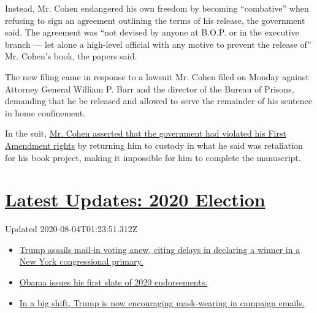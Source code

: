 Instead, Mr. Cohen endangered his own freedom by becoming ``combative''
when refusing to sign an agreement outlining the terms of his release,
the government said. The agreement was ``not devised by anyone at B.O.P.
or in the executive branch --- let alone a high-level official with any
motive to prevent the release of'' Mr. Cohen's book, the papers said.

The new filing came in response to a lawsuit Mr. Cohen filed on Monday
against Attorney General William P. Barr and the director of the Bureau
of Prisons, demanding that he be released and allowed to serve the
remainder of his sentence in home confinement.

In the suit,
\href{https://www.nytimes3xbfgragh.onion/2020/07/21/nyregion/michael-cohen-trump-book.html}{Mr.
Cohen asserted that the government had violated his First Amendment
rights} by returning him to custody in what he said was retaliation for
his book project, making it impossible for him to complete the
manuscript.

\hypertarget{latest-updates-2020-election}{%
\section{\texorpdfstring{\href{https://www.nytimes3xbfgragh.onion/2020/08/03/us/elections/biden-vs-trump.html?action=click\&pgtype=Article\&state=default\&region=MAIN_CONTENT_1\&context=storylines_live_updates}{Latest
Updates: 2020
Election}}{Latest Updates: 2020 Election}}\label{latest-updates-2020-election}}

Updated 2020-08-04T01:23:51.312Z

\begin{itemize}
\tightlist
\item
  \href{https://www.nytimes3xbfgragh.onion/2020/08/03/us/elections/biden-vs-trump.html?action=click\&pgtype=Article\&state=default\&region=MAIN_CONTENT_1\&context=storylines_live_updates\#link-6494b448}{Trump
  assails mail-in voting anew, citing delays in declaring a winner in a
  New York congressional primary.}
\item
  \href{https://www.nytimes3xbfgragh.onion/2020/08/03/us/elections/biden-vs-trump.html?action=click\&pgtype=Article\&state=default\&region=MAIN_CONTENT_1\&context=storylines_live_updates\#link-3de249e6}{Obama
  issues his first slate of 2020 endorsements.}
\item
  \href{https://www.nytimes3xbfgragh.onion/2020/08/03/us/elections/biden-vs-trump.html?action=click\&pgtype=Article\&state=default\&region=MAIN_CONTENT_1\&context=storylines_live_updates\#link-54e34d20}{In
  a big shift, Trump is now encouraging mask-wearing in campaign
  emails.}
\end{itemize}

